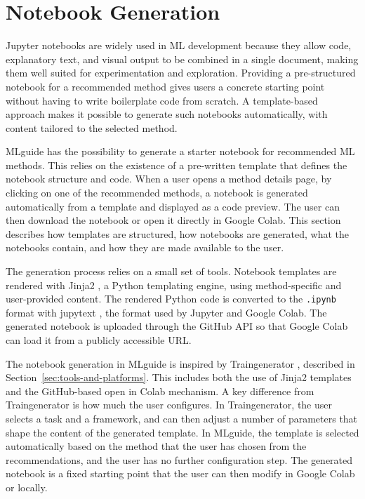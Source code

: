 \section{Notebook Generation}
\label{sec:notebook-generation}

Jupyter notebooks \parencite{kluyver2016jupyter_notebooks} are widely used in ML development because 
they allow code, explanatory text, and visual output to be combined 
in a single document, making them well suited for 
experimentation and exploration. Providing a pre-structured notebook for a 
recommended method gives users a concrete starting point 
without having to write boilerplate code from scratch. 
A template-based approach makes it possible to generate 
such notebooks automatically, with content tailored to 
the selected method.

MLguide has the possibility to generate a starter notebook for recommended ML 
methods. This relies on the existence of a pre-written template 
that defines the notebook structure and code.
When a user opens a method details page, by clicking on one of the 
recommended methods, 
a notebook is generated automatically from a template and 
displayed as a code preview. The user can then download the 
notebook or open it directly in Google Colab. This section 
describes how templates are structured, how notebooks are generated, 
what the notebooks contain, and how they are made available to the user.

The generation process relies on a small set of tools. Notebook
templates are rendered with Jinja2 \parencite{jinja2}, a Python
templating engine, using method-specific and user-provided content.
The rendered Python code is converted to the \texttt{.ipynb} format
with jupytext \parencite{Wouts_Jupytext}, the format used by Jupyter
and Google Colab. The generated notebook is uploaded through the
GitHub API so that Google Colab can load it from a publicly
accessible URL.

The notebook generation in MLguide is inspired by 
Traingenerator \parencite{rieke2021traingenerator}, described 
in Section~\ref{sec:tools-and-platforms}. This includes 
both the use of Jinja2 templates and the GitHub-based open in 
Colab mechanism.
A key difference from Traingenerator is how much the user 
configures. In Traingenerator, the user selects a task and a 
framework, and can then adjust a number of parameters that 
shape the content of the generated template. In MLguide, the 
template is selected automatically based on the method that 
the user has chosen from the recommendations, and the user 
has no further configuration step. The generated notebook is 
a fixed starting point that the user can then modify in 
Google Colab or locally.

